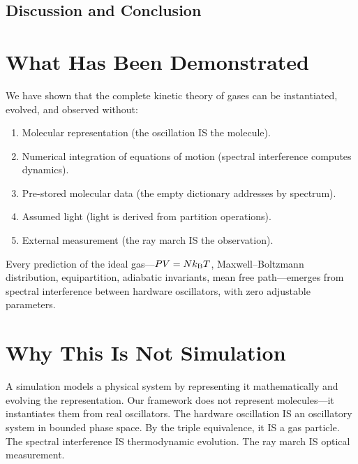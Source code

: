 
\subsection{Discussion and Conclusion}
\label{part:discussion}

\section{What Has Been Demonstrated}
\label{sec:demonstrated}

We have shown that the complete kinetic theory of gases can be instantiated, evolved, and observed without:
\begin{enumerate}
    \item Molecular representation (the oscillation IS the molecule).
    \item Numerical integration of equations of motion (spectral interference computes dynamics).
    \item Pre-stored molecular data (the empty dictionary addresses by spectrum).
    \item Assumed light (light is derived from partition operations).
    \item External measurement (the ray march IS the observation).
\end{enumerate}

Every prediction of the ideal gas---$PV = Nk_{\mathrm{B}} T$, Maxwell--Boltzmann distribution, equipartition, adiabatic invariants, mean free path---emerges from spectral interference between hardware oscillators, with zero adjustable parameters.

\section{Why This Is Not Simulation}
\label{sec:not_simulation}

A simulation models a physical system by representing it mathematically and evolving the representation. Our framework does not represent molecules---it instantiates them from real oscillators. The hardware oscillation IS an oscillatory system in bounded phase space. By the triple equivalence, it IS a gas particle. The spectral interference IS thermodynamic evolution. The ray march IS optical measurement.

